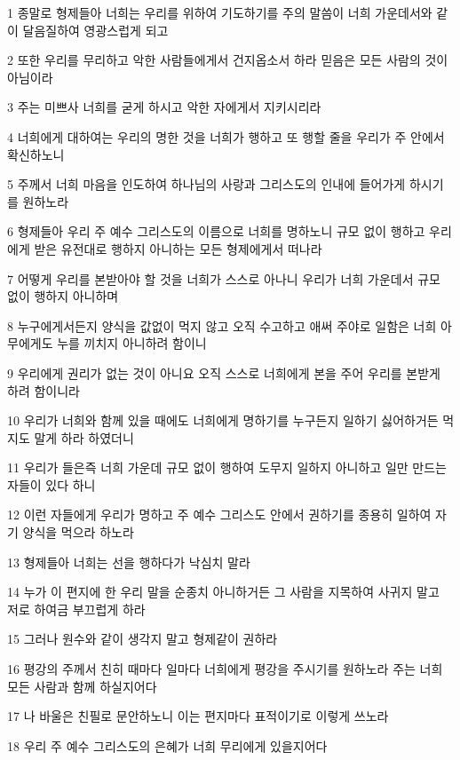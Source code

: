 \par 1 종말로 형제들아 너희는 우리를 위하여 기도하기를 주의 말씀이 너희 가운데서와 같이 달음질하여 영광스럽게 되고
\par 2 또한 우리를 무리하고 악한 사람들에게서 건지옵소서 하라 믿음은 모든 사람의 것이 아님이라
\par 3 주는 미쁘사 너희를 굳게 하시고 악한 자에게서 지키시리라
\par 4 너희에게 대하여는 우리의 명한 것을 너희가 행하고 또 행할 줄을 우리가 주 안에서 확신하노니
\par 5 주께서 너희 마음을 인도하여 하나님의 사랑과 그리스도의 인내에 들어가게 하시기를 원하노라
\par 6 형제들아 우리 주 예수 그리스도의 이름으로 너희를 명하노니 규모 없이 행하고 우리에게 받은 유전대로 행하지 아니하는 모든 형제에게서 떠나라
\par 7 어떻게 우리를 본받아야 할 것을 너희가 스스로 아나니 우리가 너희 가운데서 규모 없이 행하지 아니하며
\par 8 누구에게서든지 양식을 값없이 먹지 않고 오직 수고하고 애써 주야로 일함은 너희 아무에게도 누를 끼치지 아니하려 함이니
\par 9 우리에게 권리가 없는 것이 아니요 오직 스스로 너희에게 본을 주어 우리를 본받게 하려 함이니라
\par 10 우리가 너희와 함께 있을 때에도 너희에게 명하기를 누구든지 일하기 싫어하거든 먹지도 말게 하라 하였더니
\par 11 우리가 들은즉 너희 가운데 규모 없이 행하여 도무지 일하지 아니하고 일만 만드는 자들이 있다 하니
\par 12 이런 자들에게 우리가 명하고 주 예수 그리스도 안에서 권하기를 종용히 일하여 자기 양식을 먹으라 하노라
\par 13 형제들아 너희는 선을 행하다가 낙심치 말라
\par 14 누가 이 편지에 한 우리 말을 순종치 아니하거든 그 사람을 지목하여 사귀지 말고 저로 하여금 부끄럽게 하라
\par 15 그러나 원수와 같이 생각지 말고 형제같이 권하라
\par 16 평강의 주께서 친히 때마다 일마다 너희에게 평강을 주시기를 원하노라 주는 너희 모든 사람과 함께 하실지어다
\par 17 나 바울은 친필로 문안하노니 이는 편지마다 표적이기로 이렇게 쓰노라
\par 18 우리 주 예수 그리스도의 은혜가 너희 무리에게 있을지어다


